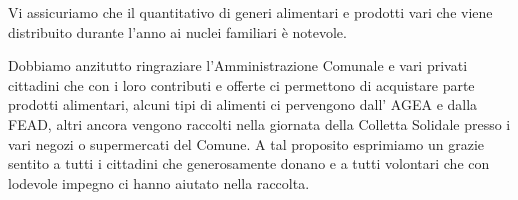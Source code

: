 Vi assicuriamo che il quantitativo di generi alimentari e prodotti vari che viene distribuito durante l’anno ai nuclei familiari è notevole.

Dobbiamo anzitutto ringraziare l’Amministrazione Comunale e vari privati cittadini che con i loro contributi e offerte ci permettono di acquistare parte prodotti alimentari, alcuni tipi di alimenti ci pervengono dall’ AGEA e dalla FEAD, altri ancora vengono raccolti nella giornata della Colletta Solidale presso i vari negozi o supermercati del Comune. A tal proposito esprimiamo un grazie sentito a tutti i cittadini che generosamente donano e a tutti volontari che con lodevole impegno ci hanno aiutato nella raccolta.


